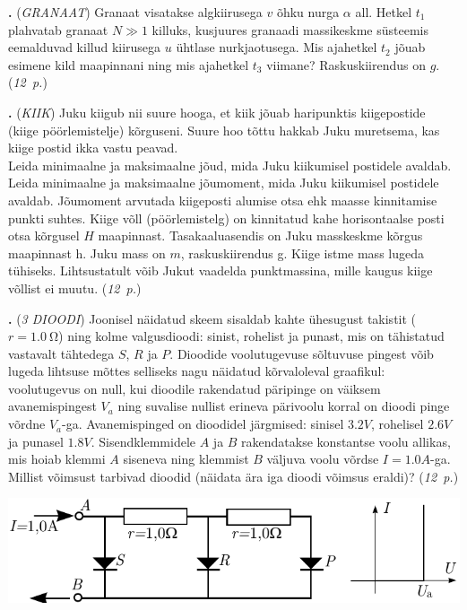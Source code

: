 \documentclass[12pt,a5paper]{article}
\newcommand{\numb}[1]{\vspace{5pt}\textbf{\large #1}}
\newcommand{\nimi}[1]{(\textsl{\small #1})}
\newcommand{\punktid}[1]{(\emph{#1~p.})}
\newcounter{ylesanne}
\newcommand{\yl}[1]{\addtocounter{ylesanne}{1}\numb{\theylesanne.} \nimi{#1} \newblock{}}
\begin{document}
\yl{GRANAAT} Granaat visatakse algkiirusega $v$ õhku nurga $\alpha$ all. Hetkel $t_1$ plahvatab granaat $N\gg1$ killuks, kusjuures granaadi massikeskme süsteemis eemalduvad killud kiirusega $u$ ühtlase nurkjaotusega. Mis ajahetkel $t_2$ jõuab esimene kild maapinnani ning mis ajahetkel $t_3$ viimane? Raskuskiirendus on $g$. \punktid{12}

\yl{KIIK} Juku kiigub  nii suure hooga, et kiik jõuab haripunktis kiigepostide (kiige pöörlemistelje) kõrguseni. Suure hoo tõttu hakkab Juku muretsema, kas kiige postid ikka vastu peavad.\\
\osa Leida minimaalne ja maksimaalne jõud, mida Juku kiikumisel postidele avaldab.\\
\osa Leida minimaalne ja maksimaalne jõumoment, mida Juku kiikumisel postidele avaldab. Jõumoment arvutada kiigeposti alumise otsa ehk maasse kinnitamise punkti suhtes.
Kiige võll (pöörlemistelg) on kinnitatud kahe horisontaalse posti otsa kõrgusel $H$ maapinnast. Tasakaaluasendis on Juku masskeskme kõrgus maapinnast h. Juku mass on $m$, raskuskiirendus g. Kiige istme mass lugeda tühiseks. Lihtsustatult võib Jukut vaadelda punktmassina, mille kaugus kiige võllist ei muutu. \punktid{12}



\yl{3 DIOODI} Joonisel näidatud skeem sisaldab kahte ühesugust takistit ($r=\SI {1.0}\ohm$) ning kolme valgusdioodi: sinist, rohelist ja punast, mis on tähistatud vastavalt tähtedega $S$, $R$ ja $P$. Dioodide voolutugevuse sõltuvuse pingest võib lugeda lihtsuse mõttes selliseks nagu näidatud kõrvaloleval graafikul: voolutugevus on null, kui dioodile rakendatud päripinge on väiksem avanemispingest $V_a$ ning suvalise nullist erineva pärivoolu korral on dioodi pinge võrdne $V_a$-ga. Avanemispinged on dioodidel järgmised: sinisel $\SI{3.2}V$, rohelisel  $\SI{2.6}V$ ja punasel  $\SI{1.8}V$. Sisendklemmidele $A$ ja $B$ rakendatakse konstantse voolu allikas, mis hoiab klemmi $A$ siseneva ning klemmist $B$ väljuva voolu võrdse $I=\SI{1.0}A$-ga. Millist võimsust tarbivad dioodid (näidata ära iga dioodi võimsus eraldi)? \punktid{12}

\includegraphics[scale=0.8]{3dioodi}
\end{document}

